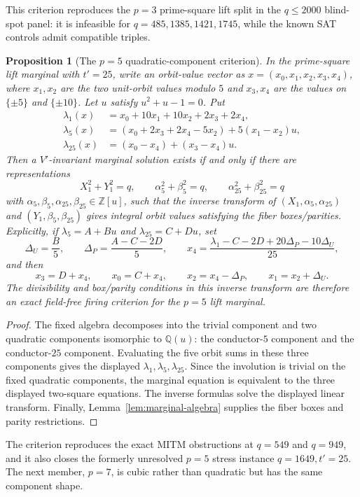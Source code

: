 \documentclass[11pt]{article}
\theoremstyle{plain}
\newtheorem{proposition}[theorem]{Proposition}
\theoremstyle{definition}
\theoremstyle{remark}
\newcommand{\Z}{\mathbb Z}
\newcommand{\Q}{\mathbb Q}
\begin{document}
This criterion reproduces the $p=3$ prime-square lift split in the
$q\le2000$ blind-spot panel: it is infeasible for
$q=485,1385,1421,1745$, while the known SAT controls admit compatible triples.

\begin{proposition}[The $p=5$ quadratic-component criterion]\label{prop:p5-sqrt5}
In the prime-square lift marginal with $t'=25$, write an orbit-value vector as
$x=(x_0,x_1,x_2,x_3,x_4)$, where $x_1,x_2$ are the two unit-orbit values
modulo $5$ and $x_3,x_4$ are the values on $\{\pm5\}$ and $\{\pm10\}$.
Let $u$ satisfy $u^2+u-1=0$. Put
\[
\begin{aligned}
\lambda_1(x)&=x_0+10x_1+10x_2+2x_3+2x_4,\\
\lambda_5(x)&=(x_0+2x_3+2x_4-5x_2)+5(x_1-x_2)u,\\
\lambda_{25}(x)&=(x_0-x_4)+(x_3-x_4)u .
\end{aligned}
\]
Then a $V'$-invariant marginal solution exists if and only if there are
representations
\[
  X_1^2+Y_1^2=q,\qquad
  \alpha_5^2+\beta_5^2=q,\qquad
  \alpha_{25}^2+\beta_{25}^2=q
\]
with $\alpha_5,\beta_5,\alpha_{25},\beta_{25}\in\Z[u]$, such that the inverse
transform of $(X_1,\alpha_5,\alpha_{25})$ and
$(Y_1,\beta_5,\beta_{25})$ gives integral orbit values satisfying the fiber
boxes/parities. Explicitly, if $\lambda_5=A+Bu$ and $\lambda_{25}=C+Du$, set
\[
  \Delta_U=\frac{B}{5},\qquad \Delta_P=\frac{A-C-2D}{5},\qquad
  x_4=\frac{\lambda_1-C-2D+20\Delta_P-10\Delta_U}{25},
\]
and then
\[
  x_3=D+x_4,\qquad x_0=C+x_4,\qquad
  x_2=x_4-\Delta_P,\qquad x_1=x_2+\Delta_U .
\]
The divisibility and box/parity conditions in this inverse transform are
therefore an exact field-free firing criterion for the $p=5$ lift marginal.
\end{proposition}

\begin{proof}
The fixed algebra decomposes into the trivial component and two quadratic
components isomorphic to $\Q(u)$: the conductor-$5$ component and the
conductor-$25$ component. Evaluating the five orbit sums in these three
components gives the displayed $\lambda_1,\lambda_5,\lambda_{25}$. Since the
involution is trivial on the fixed quadratic components, the marginal equation
is equivalent to the three displayed two-square equations. The inverse formulas
solve the displayed linear transform. Finally, Lemma~\ref{lem:marginal-algebra}
supplies the fiber boxes and parity restrictions.
\end{proof}

The criterion reproduces the exact MITM obstructions at $q=549$ and $q=949$,
and it also closes the formerly unresolved $p=5$ stress instance
$q=1649,t'=25$. The next member, $p=7$, is cubic rather than quadratic but
has the same component shape.
\end{document}
